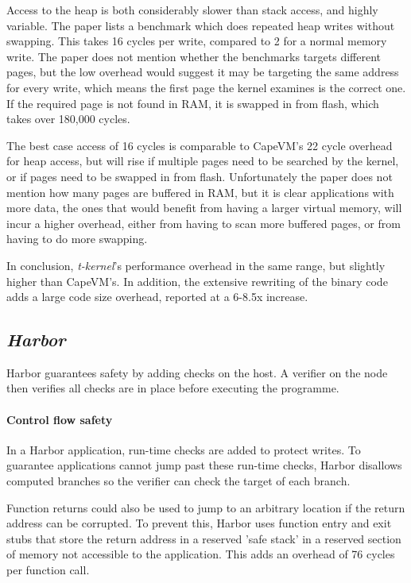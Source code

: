 Access to the heap is both considerably slower than stack access, and highly variable. The paper lists a benchmark which does repeated heap writes without swapping. This takes 16 cycles per write, compared to 2 for a normal memory write. The paper does not mention whether the benchmarks targets different pages, but the low overhead would suggest it may be targeting the same address for every write, which means the first page the kernel examines is the correct one. If the required page is not found in RAM, it is swapped in from flash, which takes over 180,000 cycles.

The best case access of 16 cycles is comparable to CapeVM's 22 cycle overhead for heap access, but will rise if multiple pages need to be searched by the kernel, or if pages need to be swapped in from flash. Unfortunately the paper does not mention how many pages are buffered in RAM, but it is clear applications with more data, the ones that would benefit from having a larger virtual memory, will incur a higher overhead, either from having to scan more buffered pages, or from having to do more swapping.

In conclusion, \emph{t-kernel}'s performance overhead in the same range, but slightly higher than CapeVM's. In addition, the extensive rewriting of the binary code adds a large code size overhead, reported at a 6-8.5x increase.




\subsection{\emph{Harbor}}
Harbor guarantees safety by adding checks on the host. A verifier on the node then verifies all checks are in place before executing the programme.

\paragraph{Control flow safety}
In a Harbor application, run-time checks are added to protect writes. To guarantee applications cannot jump past these run-time checks, Harbor disallows computed branches so the verifier can check the target of each branch.

Function returns could also be used to jump to an arbitrary location if the return address can be corrupted. To prevent this, Harbor uses function entry and exit stubs that store the return address in a reserved 'safe stack' in a reserved section of memory not accessible to the application. This adds an overhead of 76 cycles per function call.

